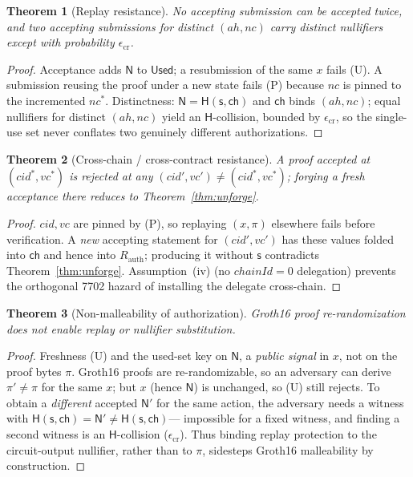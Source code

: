 \documentclass[11pt]{article}
\theoremstyle{definition}
\theoremstyle{plain}
\newtheorem{theorem}{Theorem}
\newcommand{\Hash}{\mathsf{H}}       %
\newcommand{\secret}{\mathsf{s}}
\newcommand{\chal}{\mathsf{ch}}
\newcommand{\nul}{\mathsf{N}}
\begin{document}
\begin{theorem}[Replay resistance]
\label{thm:replay}
No accepting submission can be accepted twice, and two accepting submissions for
distinct $(\mathit{ah},\mathit{nc})$ carry distinct nullifiers except with
probability $\epsilon_{\mathrm{cr}}$.
\end{theorem}
\begin{proof}
Acceptance adds $\nul$ to $\mathsf{Used}$; a resubmission of the same $x$ fails (U).
A submission reusing the proof under a new state fails (P) because $\mathit{nc}$ is
pinned to the incremented $\mathit{nc}^*$. Distinctness: $\nul=\Hash(\secret,\chal)$ and
$\chal$ binds $(\mathit{ah},\mathit{nc})$; equal nullifiers for distinct
$(\mathit{ah},\mathit{nc})$ yield an $\Hash$-collision, bounded by $\epsilon_{\mathrm{cr}}$,
so the single-use set never conflates two genuinely different authorizations.
\end{proof}

\begin{theorem}[Cross-chain / cross-contract resistance]
\label{thm:xchain}
A proof accepted at $(\mathit{cid}^*,\mathit{vc}^*)$ is rejected at any
$(\mathit{cid}',\mathit{vc}')\neq(\mathit{cid}^*,\mathit{vc}^*)$; forging a fresh
acceptance there reduces to Theorem~\ref{thm:unforge}.
\end{theorem}
\begin{proof}
$\mathit{cid},\mathit{vc}$ are pinned by (P), so replaying $(x,\pi)$ elsewhere fails
before verification. A \emph{new} accepting statement for $(\mathit{cid}',\mathit{vc}')$
has these values folded into $\chal$ and hence into $R_{\mathrm{auth}}$; producing it
without $\secret$ contradicts Theorem~\ref{thm:unforge}. Assumption~(iv)
(no $\mathit{chainId}=0$ delegation) prevents the orthogonal 7702 hazard of installing
the delegate cross-chain.
\end{proof}

\begin{theorem}[Non-malleability of authorization]
\label{thm:nonmal}
Groth16 proof re-randomization does not enable replay or nullifier substitution.
\end{theorem}
\begin{proof}
Freshness (U) and the used-set key on $\nul$, a \emph{public signal} in $x$, not on
the proof bytes $\pi$. Groth16 proofs are re-randomizable, so an adversary can derive
$\pi'\neq\pi$ for the same $x$; but $x$ (hence $\nul$) is unchanged, so (U) still
rejects. To obtain a \emph{different} accepted $\nul'$ for the same action, the
adversary needs a witness with $\Hash(\secret,\chal)=\nul'\neq\Hash(\secret,\chal)$---
impossible for a fixed witness, and finding a second witness is an $\Hash$-collision
($\epsilon_{\mathrm{cr}}$). Thus binding replay protection to the circuit-output
nullifier, rather than to $\pi$, sidesteps Groth16 malleability by construction.
\end{proof}
\end{document}
